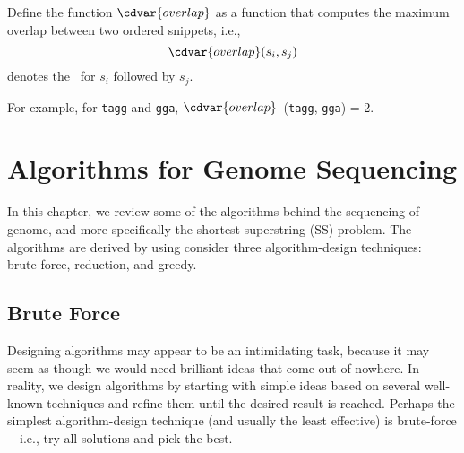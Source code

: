 \begin{cluster}
\label{grp:def:genome::prob::overlap}

\begin{definition}[Overlap]
\label{def:genome::prob::overlap}
Define the function $\cdvar{overlap}$ as a function that computes the
maximum overlap between two ordered snippets, i.e., 
\[
\cdvar{overlap}(s_i, s_j)
\]
denotes the ~for $s_i$ followed by $s_j$.

For example, for \texttt{tagg} and \texttt{gga}, $\cdvar{overlap}$~(\texttt{tagg}, \texttt{gga}) = 2.

\end{definition}
\end{cluster}


\section{Algorithms for Genome Sequencing}
\label{sec:genome::alg}

\begin{cluster}
\label{grp:grm:genome::overview}

\begin{gram}[Overview]
\label{grm:genome::overview}
In this chapter, we review some of the algorithms behind the
sequencing of genome, and more specifically the shortest superstring (SS) problem.
The algorithms are derived by using consider three algorithm-design
techniques: brute-force, reduction, and greedy.

\end{gram}
\end{cluster}


\subsection{Brute Force}
\label{sec:genome::alg::bf}

\begin{cluster}
\label{grp:grm:genome::designing}

\begin{gram}
\label{grm:genome::designing}
Designing algorithms may appear to be an intimidating task, because it
may seem as though we would need brilliant ideas that come out of
nowhere. 
In reality, we design algorithms by starting with simple ideas based
on several well-known techniques and refine them until  the
desired result is reached.
Perhaps the simplest algorithm-design technique (and usually the least
effective) is brute-force---i.e., try all solutions and pick the best.

\end{gram}
\end{cluster}

